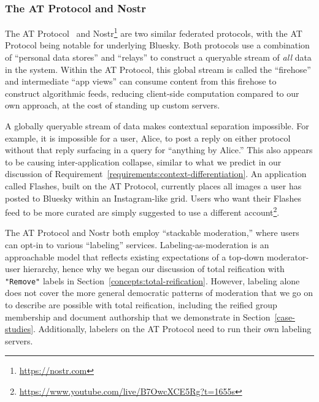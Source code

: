 

\subsubsection{The AT Protocol and Nostr}

The AT Protocol~\cite{bluesky} and Nostr\footnote{
\url{https://nostr.com}
} are two similar federated protocols,
with the AT Protocol being notable for underlying Bluesky.
Both protocols use a combination of ``personal data stores'' and ``relays''
to construct a queryable stream of \emph{all} data in the system.
Within the AT Protocol, this global stream is called the ``firehose''
and intermediate ``app views'' can consume content from this firehose to
construct algorithmic feeds, reducing client-side computation compared
to our own approach, at the cost of standing up custom servers.

A globally queryable stream of data makes contextual separation impossible.
For example, it is impossible for a user, Alice, to post a reply on either protocol
without that reply surfacing in a query for ``anything by Alice.''
This also appears to be causing inter-application collapse, similar to
what we predict in our discussion of Requirement~\ref{requirements:context-differentiation}.
An application called Flashes, built on the AT Protocol,
currently places all images a user has posted to Bluesky within
an Instagram-like grid. Users who want their Flashes feed to be
more curated are simply suggested to use a different account\footnote{
    \url{https://www.youtube.com/live/B7OwcXCE5Rg?t=1655s}
}.

The AT Protocol and Nostr both employ ``stackable
moderation,'' where users can opt-in to various ``labeling'' services.
Labeling-as-moderation is an approachable model that reflects existing expectations of a
top-down moderator-user hierarchy,
hence why we began our discussion of total reification
with \texttt{"Remove"} labels in Section~\ref{concepts:total-reification}.
However, labeling alone does not cover the more general democratic patterns
of moderation that we go on to describe are possible with total reification,
including the reified group membership and document authorship
that we demonstrate in Section~\ref{case-studies}.
Additionally, labelers on the AT Protocol need to run their own labeling servers.

